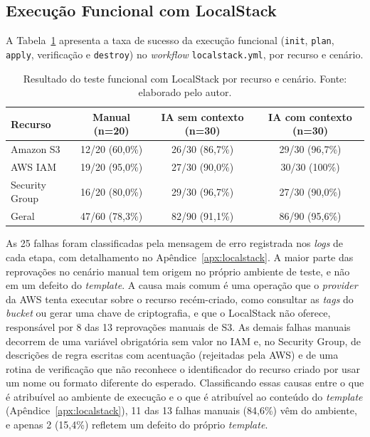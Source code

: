 \subsection{Execução Funcional com LocalStack}
\label{subsec:localstack}

A Tabela~\ref{tab:localstack} apresenta a taxa de sucesso da execução funcional (\texttt{init}, \texttt{plan}, \texttt{apply}, verificação e \texttt{destroy}) no \textit{workflow} \texttt{localstack.yml}, por recurso e cenário.

\begin{table}[H]
\centering
\caption{Resultado do teste funcional com LocalStack por recurso e cenário. Fonte: elaborado pelo autor.}
\label{tab:localstack}
\small
\begin{tabular}{l|c|c|c}
\hline
\textbf{Recurso} & \textbf{Manual (n=20)} & \textbf{IA sem contexto (n=30)} & \textbf{IA com contexto (n=30)} \\
\hline
Amazon S3 & 12/20 (60,0\%) & 26/30 (86,7\%) & 29/30 (96,7\%) \\
AWS IAM & 19/20 (95,0\%) & 27/30 (90,0\%) & 30/30 (100\%) \\
Security Group & 16/20 (80,0\%) & 29/30 (96,7\%) & 27/30 (90,0\%) \\
\hline
Geral & 47/60 (78,3\%) & 82/90 (91,1\%) & 86/90 (95,6\%) \\
\hline
\end{tabular}
\end{table}

As 25 falhas foram classificadas pela mensagem de erro registrada nos \textit{logs} de cada etapa, com detalhamento no Apêndice~\ref{apx:localstack}. A maior parte das reprovações no cenário manual tem origem no próprio ambiente de teste, e não em um defeito do \textit{template}. A causa mais comum é uma operação que o \textit{provider} da AWS tenta executar sobre o recurso recém-criado, como consultar as \textit{tags} do \textit{bucket} ou gerar uma chave de criptografia, e que o LocalStack não oferece, responsável por 8 das 13 reprovações manuais de S3. As demais falhas manuais decorrem de uma variável obrigatória sem valor no IAM e, no Security Group, de descrições de regra escritas com acentuação (rejeitadas pela AWS) e de uma rotina de verificação que não reconhece o identificador do recurso criado por usar um nome ou formato diferente do esperado. Classificando essas causas entre o que é atribuível ao ambiente de execução e o que é atribuível ao conteúdo do \textit{template} (Apêndice~\ref{apx:localstack}), 11 das 13 falhas manuais (84,6\%) vêm do ambiente, e apenas 2 (15,4\%) refletem um defeito do próprio \textit{template}.

